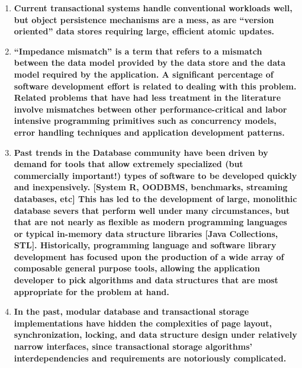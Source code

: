 \documentclass[letterpaper,twocolumn,english]{article}
\begin{document}
\begin{enumerate}


  \item {\bf Current transactional systems handle conventional workloads
  well, but object persistence mechanisms are a mess, as are
  {}``version oriented'' data stores requiring large, efficient atomic
  updates.}

  \item {\bf {}``Impedance mismatch'' is a term that refers to a mismatch
  between the data model provided by the data store and the data model
  required by the application. A significant percentage of software
  development effort is related to dealing with this problem. Related
  problems that have had less treatment in the literature involve
  mismatches between other performance-critical and labor intensive
  programming primitives such as concurrency models, error handling
  techniques and application development patterns.}
  \item {\bf Past trends in the Database community have been driven by
  demand for tools that allow extremely specialized (but commercially
  important!)  types of software to be developed quickly and
  inexpensively. {[}System R, OODBMS, benchmarks, streaming databases,
  etc{]} This has led to the development of large, monolithic database
  severs that perform well under many circumstances, but that are not
  nearly as flexible as modern programming languages or typical
  in-memory data structure libraries {[}Java Collections,
  STL{]}. Historically, programming language and software library
  development has focused upon the production of a wide array of
  composable general purpose tools, allowing the application developer
  to pick algorithms and data structures that are most appropriate for
  the problem at hand.}

  \item {\bf In the past, modular database and transactional storage
  implementations have hidden the complexities of page layout,
  synchronization, locking, and data structure design under relatively
  narrow interfaces, since transactional storage algorithms'
  interdependencies and requirements are notoriously complicated.}




\end{enumerate}
\end{document}
